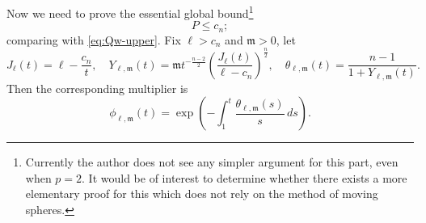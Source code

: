 \documentclass[reqno,12pt]{amsart}
\numberwithin{equation}{section}
\theoremstyle{remark}
\begin{document}
Now we need to prove the essential global bound\footnote{Currently the author does not see any simpler argument for this part, even when $p=2$. It would be of interest to determine whether there exists a more elementary proof for this which does not rely on the method of moving spheres.}
\begin{equation}\label{eq:p2-Pbound}
    P\le c_n;
\end{equation}
comparing with \eqref{eq:Qw-upper}.
Fix $\ell>c_n$ and $\mathfrak m>0$, let
$$
J_\ell(t)=\ell-\frac{c_n} t,\quad Y_{\ell,\mathfrak m}(t)= \mathfrak m t^{-\frac{n-2}{2}} \left(\frac{J_\ell(t)}{\ell-c_n}\right)^\frac n 2,\quad \theta_{\ell, \mathfrak m}(t) =\frac{n-1}{1+Y_{\ell,\mathfrak m}(t)}.
$$
Then the corresponding  multiplier is 
$$
\phi_{\ell,\mathfrak m}(t)= \exp\left(- \int_1^t\frac{\theta_{\ell, \mathfrak m}(s)}{s}\,ds\right).
$$
\end{document}
